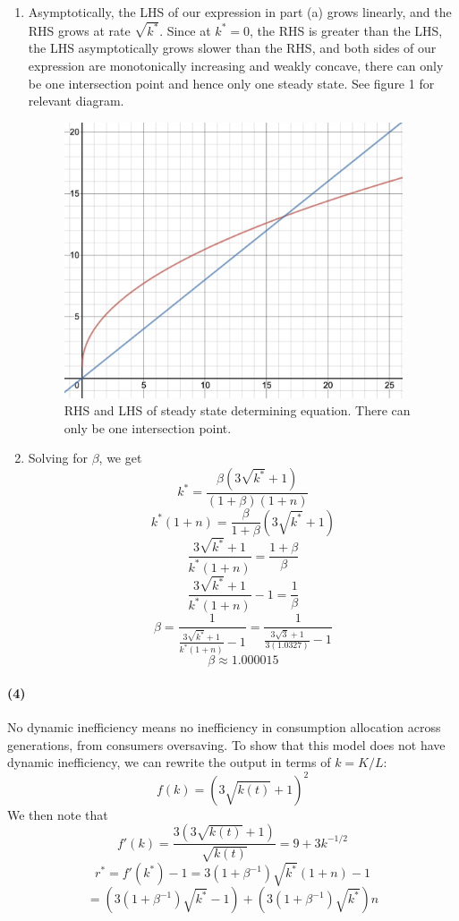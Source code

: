 \documentclass[10pt,letter]{article}
\newcommand{\problempart}[1]{\paragraph{#1}}
\begin{document}
\begin{enumerate} [label=(\alph*)]
  \item Asymptotically, the LHS of our expression in part (a) grows linearly, and the RHS grows at rate $\sqrt{k^*}$. Since at $k^* = 0$, the RHS is greater than the LHS, the LHS asymptotically grows slower than the RHS, and both sides of our expression are monotonically increasing and weakly concave, there can only be one intersection point and hence only one steady state. See figure 1 for relevant diagram.
  \begin{figure}
  \begin{centering}
  \includegraphics[width=10cm]{ps5fig1}
  \caption{RHS and LHS of steady state determining equation. There can only be one intersection point.}
  \end{centering}
  \end{figure}
  \item Solving for $\beta$, we get
  \[ k^* = \frac{\beta\left(3\sqrt{k^*} + 1 \right)}{(1+ \beta)(1+n)} \]
  \[ k^*(1+n) = \frac{\beta}{1+\beta}\left(3\sqrt{k^*} + 1 \right) \]
  \[ \frac{3\sqrt{k^*} + 1} {k^*(1+n)}=  \frac{1+\beta}{\beta} \]
  \[ \frac{3\sqrt{k^*} + 1} {k^*(1+n)} - 1 = \frac{1}{\beta} \]
  \[ \beta = \frac{1}{\frac{3\sqrt{k^*} + 1} {k^*(1+n)} - 1} = \frac{1}{\frac{3\sqrt{3} + 1} {3(1.0327)} - 1}  \]
  \[ \beta \approx 1.000015 \]
\end{enumerate}
\problempart{(4)}
No dynamic inefficiency means no inefficiency in consumption allocation across generations, from consumers oversaving. To show that this model does not have dynamic inefficiency, we can rewrite the output in terms of $k = K/L$:
\[ f(k) = (3\sqrt{k(t)} + 1)^2 \]
We then note that
\[ f'(k) = \frac{3(3 \sqrt{k(t)}+1)}{\sqrt{k(t)}} = 9 + 3k^{-1/2} \]
\[ r^* = f'(k^*) - 1 = 3(1+ \beta^{-1})\sqrt{k^*}(1+n)  - 1\]
\[= (3(1+ \beta^{-1})\sqrt{k^*}-1) + \left(3(1+ \beta^{-1})\sqrt{k^*} \right)n\]
\end{document}
